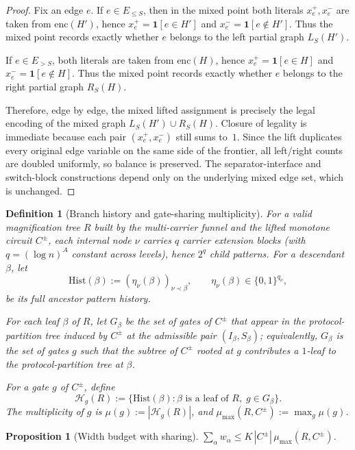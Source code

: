 \documentclass[11pt]{article}
\newtheorem{proposition}[theorem]{Proposition}
\newtheorem{definition}[theorem]{Definition}
\begin{document}
\begin{proof}
Fix an edge $e$.  If $e\in E_{\le S}$, then in the mixed point both
literals $x_e^+,x_e^-$ are taken from $\mathrm{enc}(H')$, hence
$x_e^+=\mathbf{1}[e\in H']$ and $x_e^-=\mathbf{1}[e\notin H']$.
Thus the mixed point records exactly whether $e$ belongs to the left
partial graph $L_S(H')$.

If $e\in E_{>S}$, both literals are taken from $\mathrm{enc}(H)$, hence
$x_e^+=\mathbf{1}[e\in H]$ and $x_e^-=\mathbf{1}[e\notin H]$.
Thus the mixed point records exactly whether $e$ belongs to the right
partial graph $R_S(H)$.

Therefore, edge by edge, the mixed lifted assignment is precisely the
legal encoding of the mixed graph $L_S(H')\cup R_S(H)$.  Closure of
legality is immediate because each pair $(x_e^+,x_e^-)$ still sums
to~$1$.  Since the lift duplicates every original edge variable on the
same side of the frontier, all left/right counts are doubled uniformly,
so balance is preserved.  The separator-interface and switch-block
constructions depend only on the underlying mixed edge set, which is
unchanged.
\end{proof}

\begin{definition}[Branch history and gate-sharing multiplicity]
\label{def:gate-sharing-multiplicity}
For a valid magnification tree $R$ built by the multi-carrier funnel
and the lifted monotone circuit $C^{\pm}$, each internal node $\nu$
carries $q$ carrier extension blocks (with $q = (\log n)^A$ constant
across levels), hence $2^q$ child patterns.  For a descendant $\beta$, let
\[
\mathrm{Hist}(\beta) := (\eta_\nu(\beta))_{\nu \prec \beta},
\qquad \eta_\nu(\beta) \in \{0,1\}^{q_\nu},
\]
be its full ancestor pattern history.

For each leaf $\beta$ of $R$, let $G_\beta$ be the set of gates of
$C^\pm$ that appear in the protocol-partition tree induced by $C^\pm$
at the admissible pair $(I_\beta, S_\beta)$; equivalently, $G_\beta$
is the set of gates $g$ such that the subtree of $C^\pm$ rooted at $g$
contributes a $1$-leaf to the protocol-partition tree at $\beta$.

For a gate $g$ of $C^{\pm}$, define
\[
\mathcal{H}_g(R) := \{\mathrm{Hist}(\beta) : \beta \text{ is a leaf of }
R,\; g \in G_\beta\}.
\]
The \emph{multiplicity} of $g$ is $\mu(g) := |\mathcal{H}_g(R)|$, and
$\mu_{\max}(R,C^{\pm}) := \max_g \mu(g)$.
\end{definition}

\begin{proposition}[Width budget with sharing]
\label{prop:width-budget-sharing}
$\sum_\alpha w_\alpha \le K\,|C^{\pm}|\,\mu_{\max}(R,C^{\pm})$.
\end{proposition}
\end{document}
